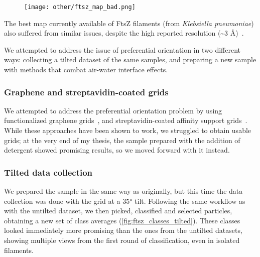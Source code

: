 \begin{figure}[ht]
    \centering
    \texttt{[image: other/ftsz\_map\_bad.png]}
    \label{fig:ftsz_map_bad}
\end{figure}

The best map currently available of FtsZ filaments (from \textit{Klebsiella pneumoniae}) also suffered from similar issues, despite the high reported resolution (\sim3 Å)~\cite{fujitaStructuresFtsZSingle2023}.

We attempted to address the issue of preferential orientation in two different ways: collecting a tilted dataset of the same samples, and preparing a new sample with methods that combat air-water interface effects.

\subsubsection{Graphene and streptavidin-coated grids}

We attempted to address the preferential orientation problem by using functionalized graphene grids~\cite{luFunctionalizedGrapheneGrids2022}, and streptavidin-coated affinity support grids~\cite{crucifixImmobilizationBiotinylatedDNA2004,hanLongShelflifeStreptavidin2016}.
While these approaches have been shown to work, we struggled to obtain usable grids; at the very end of my thesis, the sample prepared with the addition of detergent showed promising results, so we moved forward with it instead.

\subsubsection{Tilted data collection}\label{ftsz_tilted}

We prepared the sample in the same way as originally, but this time the data collection was done with the grid at a 35° tilt.
Following the same workflow as with the untilted dataset, we then picked, classified and selected particles, obtaining a new set of class averages (\autoref{fig:ftsz_classes_tilted}).
These classes looked immediately more promising than the ones from the untilted datasets, showing multiple views from the first round of classification, even in isolated filaments. %

